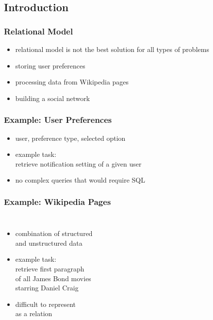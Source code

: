 \documentclass[dvipsnames]{beamer}
\theoremstyle{plain}
\begin{document}
\subsection{Introduction}

\begin{frame}
  \frametitle{Relational Model}

  \begin{itemize}
    \item relational model is not the best solution for all types of problems

    \bigskip
    \item storing user preferences
    \item processing data from Wikipedia pages
    \item building a social network
  \end{itemize}
\end{frame}

\begin{frame}
  \frametitle{Example: User Preferences}

  \begin{itemize}
    \item user, preference type, selected option

    \medskip
    \item example task:\\
      retrieve notification setting of a given user

    \pause
    \medskip
    \item no complex queries that would require SQL
  \end{itemize}
\end{frame}

\begin{frame}
  \frametitle{Example: Wikipedia Pages}

  \begin{columns}

    \begin{itemize}
      \item combination of structured\\
        and unstructured data

      \medskip
      \item example task:\\
        retrieve first paragraph\\
        of all James Bond movies\\
        starring Daniel Craig

      \pause
      \medskip
      \item difficult to represent\\
        as a relation
    \end{itemize}
  \end{columns}
\end{frame}
\end{document}
